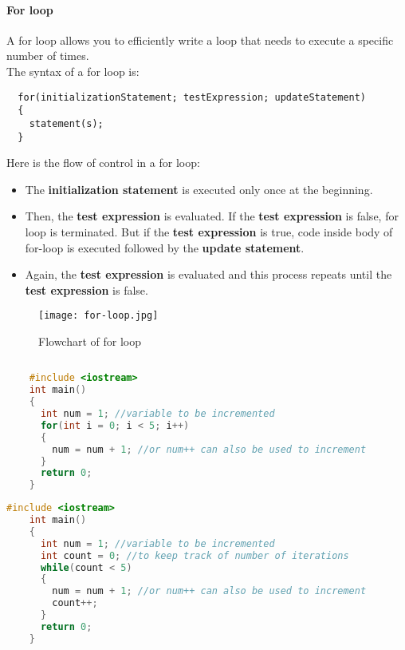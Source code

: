 \documentclass[11pt,fleqn]{book} %
\begin{document}
\paragraph{For loop}
A for loop allows you to efficiently write a loop that needs to execute a specific number of times. ~\\
The syntax of a for loop is:
\begin{lstlisting}
  for(initializationStatement; testExpression; updateStatement) 
  {
    statement(s); 
  }
\end{lstlisting}
Here is the flow of control in a for loop:
\begin{itemize}
\item The \textbf{initialization statement} is executed only once at the beginning.
\item Then, the \textbf{test expression} is evaluated.
  If the \textbf{test expression} is false, for loop is terminated. But if the \textbf{test expression} is true, code inside body of for-loop is executed followed by the \textbf{update statement}.
\item Again, the \textbf{test expression} is evaluated and this process repeats until the \textbf{test expression} is false.
\end{itemize}
\begin{figure}[H]
  \centering
  \texttt{[image: for-loop.jpg]}
  \caption{Flowchart of for loop}
\end{figure}
\begin{example}
  \begin{lstlisting}[language=C++, caption = Using For loop to increment an integer 5 times]
    
    #include <iostream>
    int main()
    {
      int num = 1; //variable to be incremented
      for(int i = 0; i < 5; i++)
      {
        num = num + 1; //or num++ can also be used to increment
      }
      return 0;
    }
  \end{lstlisting}
\end{example}

\begin{example}
  \begin{lstlisting}[language=C++, caption = Using While loop to increment an integer 5 times]
    #include <iostream>
    int main()
    {
      int num = 1; //variable to be incremented
      int count = 0; //to keep track of number of iterations
      while(count < 5)
      {
        num = num + 1; //or num++ can also be used to increment
        count++;
      }
      return 0;
    }
  \end{lstlisting}
\end{example}
\end{document}
